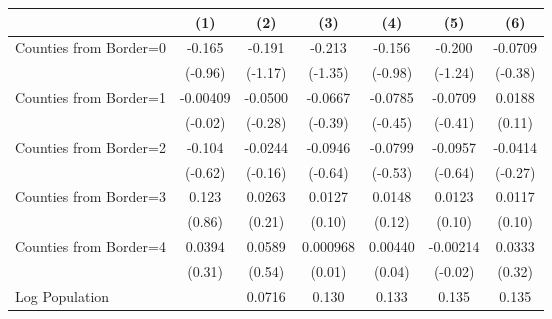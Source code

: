 {
\def\sym#1{\ifmmode^{#1}\else\(^{#1}\)\fi}
\begin{tabular}{l*{6}{c}}
\toprule
                    &\multicolumn{1}{c}{(1)}         &\multicolumn{1}{c}{(2)}         &\multicolumn{1}{c}{(3)}         &\multicolumn{1}{c}{(4)}         &\multicolumn{1}{c}{(5)}         &\multicolumn{1}{c}{(6)}         \\
\midrule
Counties from Border=0&      -0.165         &      -0.191         &      -0.213         &      -0.156         &      -0.200         &     -0.0709         \\
                    &     (-0.96)         &     (-1.17)         &     (-1.35)         &     (-0.98)         &     (-1.24)         &     (-0.38)         \\
\addlinespace
Counties from Border=1&    -0.00409         &     -0.0500         &     -0.0667         &     -0.0785         &     -0.0709         &      0.0188         \\
                    &     (-0.02)         &     (-0.28)         &     (-0.39)         &     (-0.45)         &     (-0.41)         &      (0.11)         \\
\addlinespace
Counties from Border=2&      -0.104         &     -0.0244         &     -0.0946         &     -0.0799         &     -0.0957         &     -0.0414         \\
                    &     (-0.62)         &     (-0.16)         &     (-0.64)         &     (-0.53)         &     (-0.64)         &     (-0.27)         \\
\addlinespace
Counties from Border=3&       0.123         &      0.0263         &      0.0127         &      0.0148         &      0.0123         &      0.0117         \\
                    &      (0.86)         &      (0.21)         &      (0.10)         &      (0.12)         &      (0.10)         &      (0.10)         \\
\addlinespace
Counties from Border=4&      0.0394         &      0.0589         &    0.000968         &     0.00440         &    -0.00214         &      0.0333         \\
                    &      (0.31)         &      (0.54)         &      (0.01)         &      (0.04)         &     (-0.02)         &      (0.32)         \\
\addlinespace
Log Population      &                     &      0.0716         &       0.130         &       0.133         &       0.135         &       0.135         \\

\end{tabular}}

